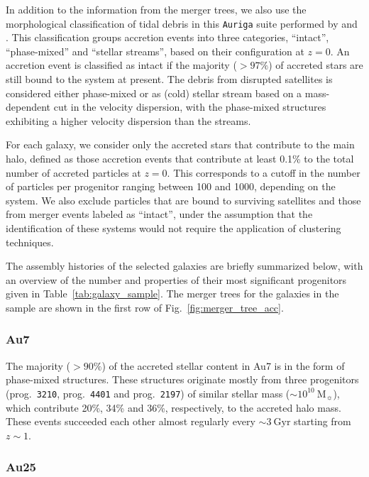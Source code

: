 In addition to the information from the merger trees, we also use the morphological classification of tidal debris in this \texttt{Auriga} suite performed by \cite{Riley2025} and \cite{Shipp2025}. This classification groups accretion events into three categories, ``intact'', ``phase-mixed'' and ``stellar streams'', based on their configuration at $z=0$.  An accretion event is classified as intact if the majority ($>97\%$) of accreted stars are still bound to the system at present. The debris from disrupted satellites is considered either phase-mixed or as (cold) stellar stream based on a mass-dependent cut in the velocity dispersion, with the phase-mixed structures exhibiting a higher velocity dispersion than the streams.

For each galaxy, we consider only the accreted stars that contribute to the main halo, defined as those accretion events that contribute at least 0.1\% to the total number of accreted particles at $z=0$. This corresponds to a cutoff in the number of particles per progenitor ranging between 100 and 1000, depending on the system. We also exclude particles that are bound to surviving satellites and those from merger events labeled as ``intact'',  under the assumption that the identification of these systems would not require the application of clustering techniques.

The assembly histories of the selected galaxies are briefly summarized below, with an overview of the number and properties of their most significant progenitors given in Table~\ref{tab:galaxy_sample}. The merger trees for the galaxies in the sample are shown in the first row of Fig.~\ref{fig:merger_tree_acc}.



\subsubsection{Au7}

The majority ($>90\%$) of the accreted stellar content in Au7 is in the form of phase-mixed structures. These structures originate mostly from three progenitors (prog.~\texttt{3210}, prog.~\texttt{4401} and prog.~\texttt{2197}) of similar stellar mass ($\sim10^{10}~\mathrm{M_{\sun}}$), which contribute 20\%, 34\% and 36\%, respectively, to the accreted halo mass. These events succeeded each other almost regularly every $\sim3~\mathrm{Gyr}$ starting from $z\sim1$.

\subsubsection{Au25}

